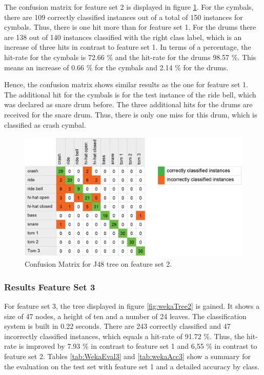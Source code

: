 The confusion matrix for feature set 2 is displayed in figure \ref{fig:wekaMatrix2}. For the cymbals, there are 109 correctly classified instances out of a total of 150 instances for cymbals. Thus, there is one hit more than for feature set 1. For the drums there are 138 out of 140 instances classified with the right class label, which is an increase of three hits in contrast to feature set 1. In terms of a percentage, the hit-rate for the cymbals is 72.66 \% and the hit-rate for the drums 98.57 \%. This means an increase of 0.66 \% for the cymbals and 2.14 \% for the drums. 

Hence, the confusion matrix shows similar results as the one for feature set 1. The additional hit for the cymbals is for the test instance of the ride bell, which was declared as snare drum before. The three additional hits for the drums are received for the snare drum. Thus, there is only one miss for this drum, which is classified as crash cymbal.

\begin{figure}[htb]
	\centering
  \includegraphics[width=.65\textwidth]{images/weka/weka_matrix_2.png}
	\caption{Confusion Matrix for J48 tree on feature set 2.}
	\label{fig:wekaMatrix2}
\end{figure}


\subsubsection{Results Feature Set 3}

For feature set 3, the tree displayed in figure \ref{fig:wekaTree2} is gained. It shows a size of 47 nodes, a height of ten and a number of 24 leaves. The classification system is built in 0.22 seconds. There are 243 correctly classified and 47 incorrectly classified instances, which equals a hit-rate of 91.72 \%. Thus, the hit-rate is improved by 7.93 \% in contrast to feature set 1 and 6,55 \% in contrast to feature set 2. Tables \ref{tab:WekaEval3} and \ref{tab:wekaAcc3} show a summary for the evaluation on the test set with feature set 1 and a detailed accuracy by class.

